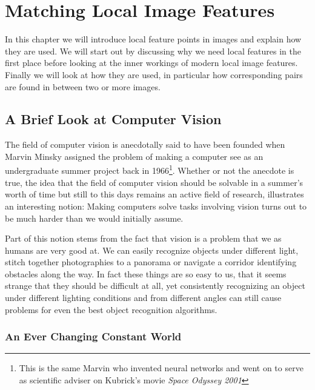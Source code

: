 \chapter{Matching Local Image Features}
\label{C:Background}

In this chapter we will introduce local feature points in images and 
explain how they are used. We will start out by discussing why we need 
local features in the first place before looking at the inner workings 
of modern local image features. Finally we will look at how they are 
used, in particular how corresponding pairs are found in between two or 
more images.

\section{A Brief Look at Computer Vision}

The field of computer vision is anecdotally said to have been founded 
when Marvin Minsky assigned the problem of making a computer see as an 
undergraduate summer project back in 1966\footnote{This is the same 
Marvin who invented neural networks and went on to serve as scientific 
adviser on Kubrick's movie \emph{Space Odyssey 2001}}. Whether or not 
the anecdote is true, the idea that the field of computer vision should 
be solvable in a summer's worth of time but still to this days remains 
an active field of research, illustrates an interesting notion: Making 
computers solve tasks involving vision turns out to be much harder than 
we would initially assume.

Part of this notion stems from the fact that vision is a problem that we 
as humans are very good at. We can easily recognize objects under 
different light, stitch together photographies to a panorama or navigate 
a corridor identifying obstacles along the way. In fact these things are 
so easy to us, that it seems strange that they should be difficult at 
all, yet consistently recognizing an object under different lighting 
conditions and from different angles can still cause problems for even 
the best object recognition algorithms.

\subsection{An Ever Changing Constant World}

